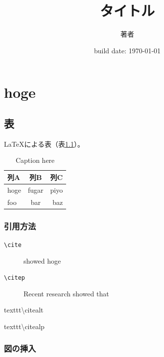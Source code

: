 \documentclass[dvipdfmx, 11pt, a4paper]{jsbook}
\title{タイトル}
\date{build date: \today}
\author{著者}
\begin{document}
\maketitle
\tableofcontents


\chapter{hoge}

\blindtext

\section{表}


\LaTeX による表（表\ref{table:label_here}）。

\begin{table}[hbtp]
  \caption{Caption here}
  \label{table:label_here}
  \centering
  \begin{tabular}{lcr}
    \hline
    列A  & 列B  &  列C  \\
    \hline \hline
    hoge  & fugar  & piyo \\
    foo  & bar  & baz \\
    \hline
  \end{tabular}
\end{table}


\blindtext

\subsection{引用方法}
\begin{description}
  \item[\texttt{\textbackslash cite}]\cite{doe2021-my-excelent} showed hoge
  \item[\texttt{\textbackslash citep}]Recent research \citep{doe2021-my-excelent} showed that
  \item[texttt{\textbackslash citealt}]\citealt{doe2021-my-excelent}
  \item[texttt{\textbackslash citealp}]\citealp{doe2021-my-excelent}
\end{description}

\clearpage

\subsection{図の挿入}
\end{document}

